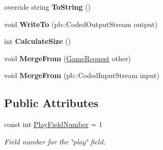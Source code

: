 \begin{DoxyCompactItemize}
\item 
\mbox{\label{class_coinche_1_1_google_1_1_protobuf_1_1_game_request_a6b98ae0b06aa78d0369f65b81ca677b6}} 
override string {\bfseries To\+String} ()
\item 
\mbox{\label{class_coinche_1_1_google_1_1_protobuf_1_1_game_request_a0c2345787cdc5861832e873435efc270}} 
void {\bfseries Write\+To} (pb\+::\+Coded\+Output\+Stream output)
\item 
\mbox{\label{class_coinche_1_1_google_1_1_protobuf_1_1_game_request_a987e48747e64faec5e17851a6ea5ea3c}} 
int {\bfseries Calculate\+Size} ()
\item 
\mbox{\label{class_coinche_1_1_google_1_1_protobuf_1_1_game_request_aa124e890b22980c0ff98339a597393b9}} 
void {\bfseries Merge\+From} (\hyperlink{class_coinche_1_1_google_1_1_protobuf_1_1_game_request}{Game\+Request} other)
\item 
\mbox{\label{class_coinche_1_1_google_1_1_protobuf_1_1_game_request_a52fe24d58b6d250d632ed6def954e5e7}} 
void {\bfseries Merge\+From} (pb\+::\+Coded\+Input\+Stream input)
\end{DoxyCompactItemize}
\subsection*{Public Attributes}
\begin{DoxyCompactItemize}
\item 
const int \hyperlink{class_coinche_1_1_google_1_1_protobuf_1_1_game_request_ab8aaf361fd25dc835cdcdf47aebb47b5}{Play\+Field\+Number} = 1
\begin{DoxyCompactList}\small\item\em Field number for the \char`\"{}play\char`\"{} field.\end{DoxyCompactList}\end{DoxyCompactItemize}
